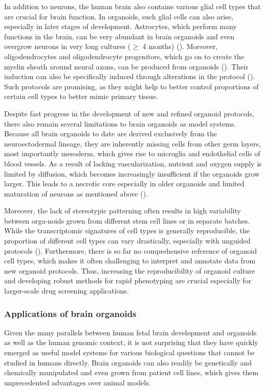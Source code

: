 In addition to neurons, the human brain also contains various glial cell types that are crucial for brain function. In organoids, such glial cells can also arise, especially in later stages of development. Astrocytes, which perform many functions in the brain, can be very abundant in brain organoids and even overgrow neurons in very long cultures ($\geq$ 4 months) (\cite{kanton_organoid_2019,giandomenico_cerebral_2019,sloan_human_2017}). Moreover, oligodendrocytes and oligodendrocyte progenitors, which go on to create the myelin sheath around neural axons, can be produced from organoids (\cite{tanaka_synthetic_2020}). Their induction can also be specifically induced through alterations in the protocol (\cite{madhavan_induction_2018,marton_differentiation_2019}). Such protocols are promising, as they might help to better control proportions of certain cell types to better mimic primary tissue.

Despite fast progress in the development of new and refined organoid protocols, there also remain several limitations to brain organoids as model systems. Because all brain organoids to date are derived exclusively from the neuroectodermal lineage, they are inherently missing cells from other germ layers, most importantly mesoderm, which gives rise to microglia and endothelial cells of blood vessels. As a result of lacking vascularization, nutrient and oxygen supply is limited by diffusion, which becomes increasingly insufficient if the organoids grow larger. This leads to a necrotic core especially in older organoids and limited maturation of neurons as mentioned above (\cite{vertesy_cellular_2022,bhaduri_cell_2020}). 

Moreover, the lack of stereotypic patterning often results in high variability between orga-noids grown from different stem cell lines or in separate batches. While the transcriptomic signatures of cell types is generally reproducible, the proportion of different cell types can vary drastically, especially with unguided protocols (\cite{kanton_organoid_2019}). Furthermore, there is so far no comprehensive reference of organoid cell types, which makes it often challenging to interpret and annotate data from new organoid protocols. Thus, increasing the reproducibility of organoid culture and developing robust methods for rapid phenotyping are crucial especially for larger-scale drug screening applications. 



\subsubsection{Applications of brain organoids}
Given the many parallels between human fetal brain development and organoids as well as the human genomic context, it is not surprising that they have quickly emerged as useful model systems for various biological questions that cannot be studied in humans directly. Brain organoids can also readily be genetically and chemically manipulated and even grown from patient cell lines, which gives them unprecedented advantages over animal models. 

